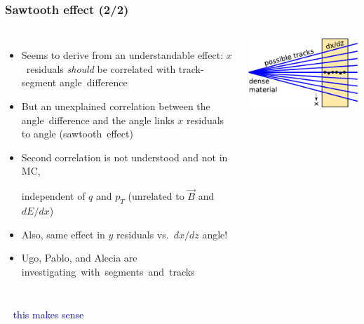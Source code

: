 \documentclass[compress]{beamer}
\begin{document}
\begin{frame}
\frametitle{Sawtooth effect (2/2)}

\begin{columns}
\begin{itemize}\setlength{\itemsep}{0.25 cm}
\item Seems to derive from an understandable effect: \mbox{$x$ residuals\hspace{-1 cm}}
  {\it should} be correlated with track-segment \mbox{angle difference\hspace{-1 cm}}
\item But an unexplained correlation between the \mbox{angle difference\hspace{-0.75 cm}} and
  the angle links $x$ residuals to angle \mbox{(sawtooth effect)\hspace{-1 cm}}
\item Second correlation is not understood and not in MC,

independent of $q$ and $p_T$ (unrelated to $\vec{B}$ and $dE/dx$)

\item Also, same effect in $y$ residuals vs.\ $dx/dz$ angle!

\item Ugo, Pablo, and Alecia are \mbox{investigating with segments and tracks\hspace{-5 cm}}

\end{itemize}

\includegraphics[width=\linewidth]{understandable_correlation_diagram.pdf}
\end{columns}

\vfill
\begin{columns}
\mbox{ } \hfill \textcolor{darkblue}{this makes sense} \hfill \mbox{ }


\end{columns}
\end{frame}
\end{document}
